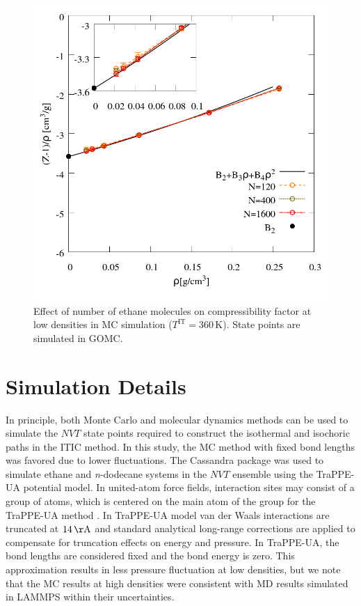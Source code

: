 \documentclass[%
 aip,
 jcp,
 sd,%
 amsmath,amssymb,
 reprint,%
]{revtex4-1}
\begin{document}
\begin{figure}
\includegraphics[scale=0.3]{Figures/FSE_TraPPE-C2_GOMC_IT.png}
\caption{Effect of number of ethane molecules on compressibility factor at low densities in MC simulation ($T^{\mathrm{IT}}=360 \, \mathrm{K}$). State points are simulated in GOMC.}
\label{fig:FSE_TraPPE_C2_GOMC_IT}
\end{figure}


\section{Simulation Details} \label{sec:SimDetail}
In principle, both Monte Carlo and molecular dynamics methods can be used to simulate the $NVT$ state points required to construct the isothermal and isochoric paths in the ITIC method. In this study, the MC method with fixed bond lengths was favored due to lower fluctuations. The Cassandra package \cite{Shah2017} was used to simulate ethane and \textit{n}-dodecane systems in the $NVT$ ensemble using the TraPPE-UA potential model. In united-atom force fields, interaction sites may consist of a group of atoms, which is centered on the main atom of the group for the TraPPE-UA method \cite{Smit1998}. In TraPPE-UA model van der Waals interactions are truncated at $14\,\mathrm{\AA}$ and standard analytical long-range corrections are applied to compensate for truncation effects on energy and pressure\cite{allen2017}. In TraPPE-UA, the bond lengths are considered fixed and the bond energy is zero. This approximation results in less pressure fluctuation at low densities, but we note that the MC results at high densities were consistent with MD results simulated in LAMMPS \cite{Plimpton2007} within their uncertainties.
\end{document}
